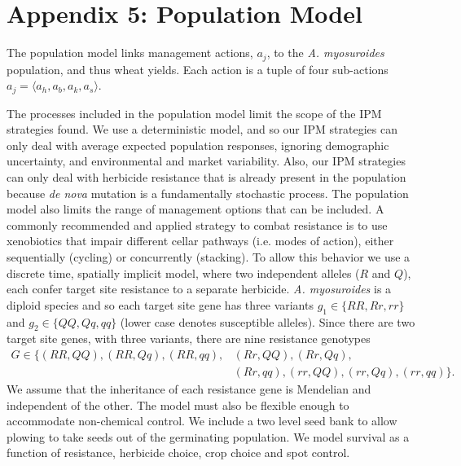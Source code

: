 \documentclass[12pt, a4paper]{article}
\begin{document}
\section*{Appendix 5: Population Model}
The population model links management actions, $a_j$, to the \textit{A. myosuroides} population, and thus wheat yields. Each action is a tuple of four sub-actions $a_j = \langle a_h, a_b, a_k, a_s \rangle$. 

The processes included in the population model limit the scope of the IPM strategies found. We use a deterministic model, and so our IPM strategies can only deal with average expected population responses, ignoring demographic uncertainty, and environmental and market variability. Also, our IPM strategies can only deal with herbicide resistance that is already present in the population because \textit{de nova} mutation is a fundamentally stochastic process. The population model also limits the range of management options that can be included. A commonly recommended \citep{REX2013} and applied \citep{Hick2018} strategy to combat resistance is to use xenobiotics that impair different cellar pathways (i.e. modes of action), either sequentially (cycling) or concurrently (stacking). To allow this behavior we use a discrete time, spatially implicit model, where two independent alleles ($R$ and $Q$), each confer target site resistance to a separate herbicide. \textit{A. myosuroides} is a diploid species and so each target site gene has three variants $g_1 \in \{RR, Rr, rr\}$ and $g_2 \in \{QQ, Qq, qq\}$ (lower case denotes susceptible alleles). Since there are two target site genes, with three variants, there are nine resistance genotypes 
\begin{align*}
	G \in \{(RR, QQ), (RR, Qq), (RR, qq), &(Rr, QQ), (Rr, Qq),\\
		&(Rr, qq), (rr, QQ), (rr, Qq), (rr, qq)\}.  
\end{align*}
We assume that the inheritance of each resistance gene is Mendelian and independent of the other. The model must also be flexible enough to accommodate non-chemical control. We include a two level seed bank to allow plowing to take seeds out of the germinating population. We model survival as a function of resistance, herbicide choice, crop choice and spot control.
\end{document}
